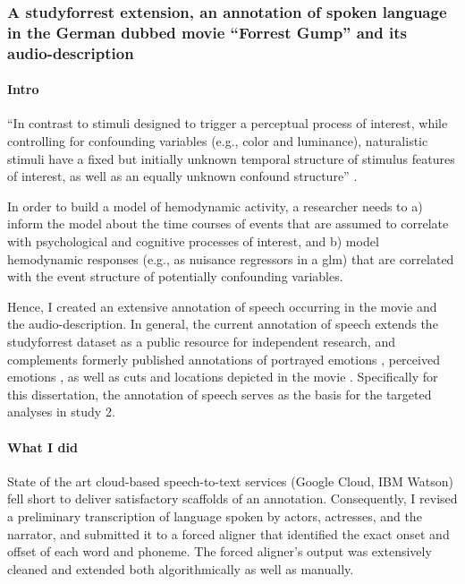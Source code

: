 \subsubsection{A studyforrest extension, an annotation of spoken language in the
German dubbed movie ``Forrest Gump'' and its audio-description}


\paragraph{Intro}


``In contrast to stimuli designed to trigger a perceptual process of interest,
while controlling for confounding variables (e.g., color and luminance),
naturalistic stimuli have a fixed but initially unknown temporal structure of
stimulus features of interest, as well as an equally unknown confound
structure'' \citep{haeusler2021speechanno}.

%
In order to build a model of hemodynamic activity, a researcher needs to a)
inform the model about the time courses of events that are assumed to correlate
with psychological and cognitive processes of interest, and b) model hemodynamic
responses (e.g., as nuisance regressors in a \ac{glm}) that are correlated with
the event structure of potentially confounding variables.

%
Hence, I created an extensive annotation of speech occurring in the movie and
the audio-description.
%
In general, the current annotation of speech extends the studyforrest dataset
as a public resource for independent research, and complements formerly
published annotations of portrayed emotions \citep{labs2015portrayed}, perceived
emotions \citep{lettieri2019emotionotopy}, as well as cuts and locations
depicted in the movie \citep{haeusler2016cutanno}.
%
Specifically for this dissertation, the annotation of speech serves as the basis
for the targeted analyses in study 2.


\paragraph{What I did}
State of the art cloud-based speech-to-text services (Google Cloud, IBM Watson)
fell short to deliver satisfactory scaffolds of an annotation.
Consequently, I revised a preliminary transcription of language spoken by
actors, actresses, and the narrator, and submitted it to a forced aligner
\citep[\href{https://github.com/MontrealCorpusTools/Montreal-Forced-Aligner}{Montreal
Forced Aligner} v1.0.1;][]{mcauliffe2017montreal} that identified the exact
onset and offset of each word and phoneme. The forced aligner's output was
extensively cleaned and extended both algorithmically as well as manually.


